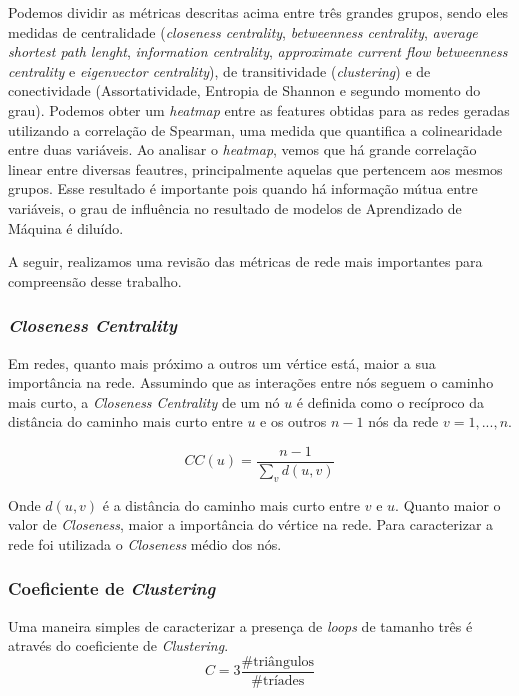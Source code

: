 Podemos dividir as métricas descritas acima entre três grandes grupos,
sendo eles medidas de centralidade (\emph{closeness centrality},
\emph{betweenness centrality}, \emph{average shortest path lenght},
\emph{information centrality}, \emph{approximate current flow
betweenness centrality} e \emph{eigenvector centrality}), de
transitividade (\emph{clustering}) e de conectividade (Assortatividade,
Entropia de Shannon e segundo momento do grau). Podemos obter um
\emph{heatmap} entre as features obtidas para as redes geradas
utilizando a correlação de Spearman, uma medida que quantifica a
colinearidade entre duas variáveis. Ao analisar o \emph{heatmap}, vemos
que há grande correlação linear entre diversas feautres, principalmente
aquelas que pertencem aos mesmos grupos. Esse resultado é importante
pois quando há informação mútua entre variáveis, o grau de influência no
resultado de modelos de Aprendizado de Máquina é diluído.

A seguir, realizamos uma revisão das métricas de rede mais importantes
para compreensão desse trabalho.

\subsubsection{\texorpdfstring{\emph{Closeness
Centrality}}{Closeness Centrality}}\label{closeness-centrality}

Em redes, quanto mais próximo a outros um vértice está, maior a sua
importância na rede. Assumindo que as interações entre nós seguem o
caminho mais curto, a \emph{Closeness Centrality} de um nó \(u\) é
definida como o recíproco da distância do caminho mais curto entre \(u\)
e os outros \(n-1\) nós da rede \(v=1,...,n\).

\[
CC(u) = \dfrac{n-1}{\sum_v d(u, v)}
\]

Onde \(d(u, v)\) é a distância do caminho mais curto entre \(v\) e
\(u\). Quanto maior o valor de \emph{Closeness}, maior a importância do
vértice na rede. Para caracterizar a rede foi utilizada o
\emph{Closeness} médio dos nós.

\subsubsection{\texorpdfstring{Coeficiente de
\emph{Clustering}}{Coeficiente de Clustering}}\label{coeficiente-de-clustering}

Uma maneira simples de caracterizar a presença de \emph{loops} de
tamanho três é através do coeficiente de \emph{Clustering}. \[
C = 3\frac{\#\text{triângulos}}{\#\text{tríades}}
\]

